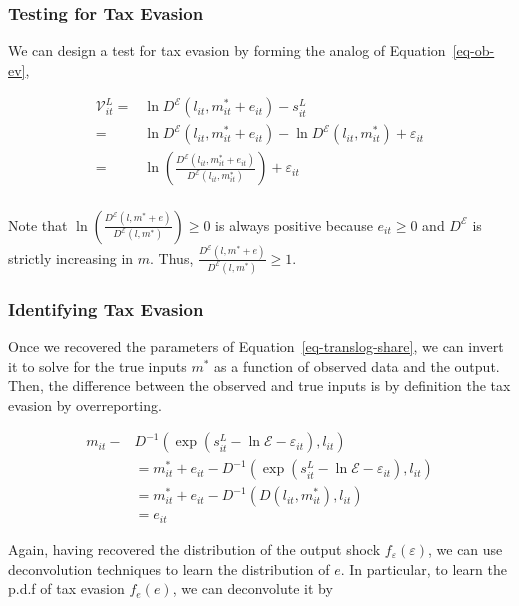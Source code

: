 \documentclass[
  12pt]{article}
\theoremstyle{definition}
\theoremstyle{remark}
\begin{document}
\subsubsection{Testing for Tax Evasion}\label{testing-for-tax-evasion}

We can design a test for tax evasion by forming the analog of
Equation~\ref{eq-ob-ev},

\[
\begin{aligned}
\mathcal{V}_{it}^{L} =&\ln D^{\mathcal{E}}(l_{it},m_{it}^*+e_{it})-s_{it}^L\\
    =&\ln D^{\mathcal{E}}(l_{it},m_{it}^*+e_{it})-\ln D^{\mathcal{E}}(l_{it},m_{it}^*)+\varepsilon_{it}\\
    =&\ln\left(\frac{D^{\mathcal{E}}(l_{it},m_{it}^*+e_{it})}{D^{\mathcal{E}}(l_{it},m_{it}^*)}\right)+\varepsilon_{it}\\
\end{aligned}
\]

Note that
\(\ln\left(\frac{D^{\mathcal{E}}(l,m^*+e)}{D^{\mathcal{E}}(l,m^*)}\right)\ge0\)
is always positive because \(e_{it}\ge0\) and \(D^{\mathcal{E}}\) is
strictly increasing in \(m\). Thus,
\(\frac{D^{\mathcal{E}}(l,m^*+e)}{D^{\mathcal{E}}(l,m^*)}\ge1\).

\subsubsection{Identifying Tax Evasion}\label{identifying-tax-evasion-1}

Once we recovered the parameters of Equation~\ref{eq-translog-share}, we
can invert it to solve for the true inputs \(m^*\) as a function of
observed data and the output. Then, the difference between the observed
and true inputs is by definition the tax evasion by overreporting.

\[
\begin{aligned}
    m_{it}-&D^{-1}(\exp(s^L_{it}-\ln\mathcal{E}-\varepsilon_{it}),l_{it})\\
    &= m_{it}^*+e_{it} -D^{-1}(\exp(s^L_{it}-\ln\mathcal{E}-\varepsilon_{it}),l_{it})\\
    &= m_{it}^*+e_{it} -D^{-1}(D(l_{it},m_{it}^*),l_{it})\\
    &=e_{it}
\end{aligned}
\]

Again, having recovered the distribution of the output shock
\(f_{\varepsilon}(\varepsilon)\), we can use deconvolution techniques to
learn the distribution of \(e\). In particular, to learn the p.d.f of
tax evasion \(f_e(e)\), we can deconvolute it by
\end{document}

